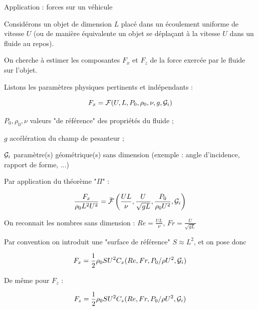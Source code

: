 \begin{frame}{Application : forces sur un véhicule}  

\small
%
Considérons un objet de dimension $L$ placé dans un écoulement uniforme de vitesse $U$
(ou de manière équivalente un objet se déplaçant à la vitesse $U$ dans un fluide au repos).

\smallskip


On cherche à estimer les composantes $F_x$ et $F_z$ 
de la force exercée par le fluide sur l'objet.

\medskip
\pause

Listons les paramètres physiques pertinents et indépendants :

\medskip
\pause

$$
F_x = {\cal F}( U, L, P_0, \rho_0, \nu, g, {\cal G}_i)
$$

$P_0, \rho_0, \nu$ valeurs "de référence" des propriétés du fluide ;

$g$ accélération du champ de pesanteur ;

${\cal G}_i$ paramètre(s) géométrique(s) sans dimension (exemple : angle d'incidence, rapport de forme, ...)



\medskip
\pause

Par application du théorème "$\Pi$" :

$$
\frac{F_x}{\rho_0 L^2 U^2} = \bar{\cal F} \left( \frac{U L}{\nu}, \frac{U}{\sqrt{gL}} , \frac{P_0}{\rho_0 U^2}, {\cal G}_i \right)
$$


On reconnait les nombres sans dimension : $Re= \frac{U L}{\nu}$, $Fr = \frac{U}{\sqrt{gL}}$

\smallskip
\pause

Par convention on introduit une "surface de référence" $S \approx L^2$, et on pose donc 
 
$$
F_x = \frac{1}{2} \rho_0 S U^2 C_x(Re, Fr, P_0/\rho U^2, {\cal G}_i)
$$

De même pour $F_z$ : 

$$
F_z = \frac{1}{2} \rho_0 S U^2 C_z(Re, Fr, P_0/\rho U^2,{\cal G}_i)
$$

\end{frame}


